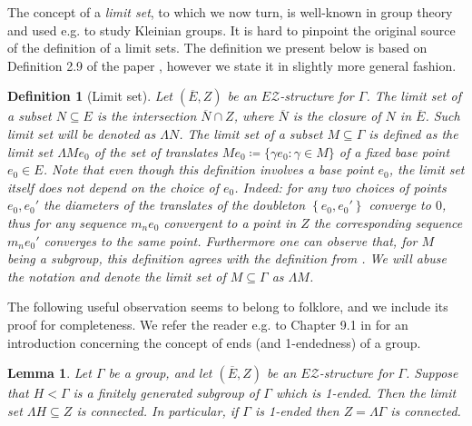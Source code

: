 \documentclass[12pt, a4paper]{article}
\newcommand{\8}{\infty}
\newcommand{\set}[1]{\left\{ #1 \right\}}
\theoremstyle{break}
\newtheorem{lm}[thm]{Lemma}
\theoremstyle{defbreak}
\newtheorem{df}[thm]{Definition}
\newcommand{\ol}[1]{\overline{#1}}
\begin{document}

The concept of a {\it limit set}, to which we now turn, is well-known in group theory and used e.g. to study Kleinian groups. It is hard to pinpoint the original source of the definition of a limit sets. The definition we present below is based on Definition 2.9 of the paper \cite{martin}, however we state it in slightly more general fashion.\medskip

\begin{df}[Limit set]
    Let $(\ol{E},Z)$ be an $E\mathcal{Z}$-structure for $\Gamma$. The \textit{limit set} of a subset $N\subseteq E$ is the intersection $\ol{N}\cap Z$, where $\ol{N}$ is the closure of $N$ in $\ol{E}$. Such limit set will be denoted as $\Lambda N$. The \textit{limit set of a subset }$M\subseteq\Gamma$ is defined as the limit set $\Lambda Me_0$ of the set of translates $Me_0\coloneqq\{ \gamma e_0:\gamma\in M \}$ 
    of a fixed base point $e_0\in E$. Note that even though this definition involves a base point $e_0$, the limit set itself does not depend on the choice of $e_0$. Indeed: for any two choices of points $e_0, e_0'$ the diameters of the translates of the doubleton $\set{e_0,e_0'}$ converge to $0$, thus for any sequence $m_ne_0$ convergent to a point in $Z$ the corresponding sequence $m_ne_0'$ converges to the same point. Furthermore one can observe that, for $M$ being a subgroup, this definition agrees with the definition from \cite{martin}. We will abuse the notation and denote the limit set of $M\subseteq \Gamma$ as $\Lambda M$.
\end{df}


The following useful observation seems to belong to folklore,
and we include its proof for completeness.
We refer the reader e.g. to Chapter 9.1 in \cite{drutu-kapovich}
for an introduction concerning the concept of ends (and 1-endedness) of a group.\medskip

\begin{lm}\label{limit_set_connected}
Let $\Gamma$ be a group, and let $(\ol E,Z)$ be an  $E\mathcal{Z}$-structure for $\Gamma$. Suppose that $H<\Gamma$ is a finitely generated
subgroup of $\Gamma$ which is 1-ended.
Then the limit set $\Lambda H\subseteq Z$ is connected.
In particular, if $\Gamma$ is 1-ended then $Z=\Lambda\Gamma$
is connected. 
\end{lm}
\end{document}

